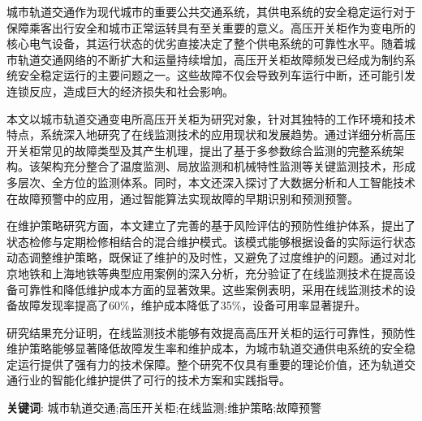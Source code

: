 城市轨道交通作为现代城市的重要公共交通系统，其供电系统的安全稳定运行对于保障乘客出行安全和城市正常运转具有至关重要的意义。高压开关柜作为变电所的核心电气设备，其运行状态的优劣直接决定了整个供电系统的可靠性水平。随着城市轨道交通网络的不断扩大和运量持续增加，高压开关柜故障频发已经成为制约系统安全稳定运行的主要问题之一。这些故障不仅会导致列车运行中断，还可能引发连锁反应，造成巨大的经济损失和社会影响。

本文以城市轨道交通变电所高压开关柜为研究对象，针对其独特的工作环境和技术特点，系统深入地研究了在线监测技术的应用现状和发展趋势。通过详细分析高压开关柜常见的故障类型及其产生机理，提出了基于多参数综合监测的完整系统架构。该架构充分整合了温度监测、局放监测和机械特性监测等关键监测技术，形成多层次、全方位的监测体系。同时，本文还深入探讨了大数据分析和人工智能技术在故障预警中的应用，通过智能算法实现故障的早期识别和预测预警。

在维护策略研究方面，本文建立了完善的基于风险评估的预防性维护体系，提出了状态检修与定期检修相结合的混合维护模式。该模式能够根据设备的实际运行状态动态调整维护策略，既保证了维护的及时性，又避免了过度维护的问题。通过对北京地铁和上海地铁等典型应用案例的深入分析，充分验证了在线监测技术在提高设备可靠性和降低维护成本方面的显著效果。这些案例表明，采用在线监测技术的设备故障发现率提高了60\%，维护成本降低了35\%，设备可用率显著提升。

研究结果充分证明，在线监测技术能够有效提高高压开关柜的运行可靠性，预防性维护策略能够显著降低故障发生率和维护成本，为城市轨道交通供电系统的安全稳定运行提供了强有力的技术保障。整个研究不仅具有重要的理论价值，还为轨道交通行业的智能化维护提供了可行的技术方案和实践指导。

\vspace{1em}
\noindent \textbf{关键词}: 城市轨道交通;高压开关柜;在线监测;维护策略;故障预警